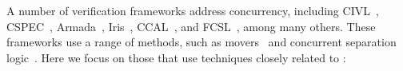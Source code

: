 
A number of verification frameworks address concurrency, including
CIVL~\cite{hawblitzel:civl}, CSPEC~\cite{chajed:cspec},
Armada~\cite{lorch:armada}, Iris~\cite{jung:iris-jfp}, CCAL~\cite{gu:certikos-ccal},
and FCSL~\cite{sergey:fcsl}, among many others. These frameworks use a range of
methods, such as movers~\cite{lipton:movers} and concurrent separation
logic~\cite{brookes:csl}. Here we focus on those that use techniques closely related to \sys:




